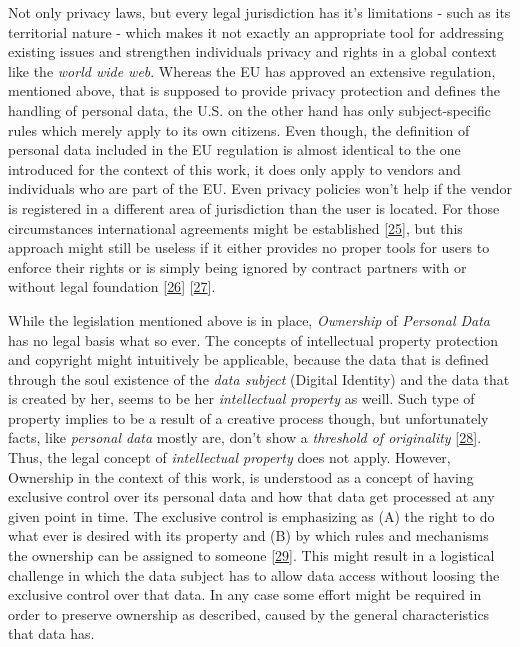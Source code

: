 \documentclass[12pt,english,a4paper,titlepage,cleardoublepage=empty,dottedtoc]{report}
\begin{document}
Not only privacy laws, but every legal jurisdiction has it's limitations
- such as its territorial nature - which makes it not exactly an
appropriate tool for addressing existing issues and strengthen
individuals privacy and rights in a global context like the \emph{world
wide web}. Whereas the EU has approved an extensive regulation,
mentioned above, that is supposed to provide privacy protection and
defines the handling of personal data, the U.S. on the other hand has
only subject-specific rules which merely apply to its own citizens. Even
though, the definition of personal data included in the EU regulation is
almost identical to the one introduced for the context of this work, it
does only apply to vendors and individuals who are part of the EU. Even
privacy policies won't help if the vendor is registered in a different
area of jurisdiction than the user is located. For those circumstances
international agreements might be established
{[}\protect\hyperlink{ref-web_2016_international-privacy-standards}{25}{]},
but this approach might still be useless if it either provides no proper
tools for users to enforce their rights or is simply being ignored by
contract partners with or without legal foundation
{[}\protect\hyperlink{ref-web_2017_privacy-shield_faq}{26}{]}
{[}\protect\hyperlink{ref-web_2017_privacy-shield_kritik}{27}{]}.

While the legislation mentioned above is in place,
\emph{\protect\hypertarget{def--ownership}{}{Ownership}} of
\emph{Personal Data} has no legal basis what so ever. The concepts of
intellectual property protection and copyright might intuitively be
applicable, because the data that is defined through the soul existence
of the \emph{data subject} (Digital Identity) and the data that is
created by her, seems to be her \emph{intellectual property} as weill.
Such type of property implies to be a result of a creative process
though, but unfortunately facts, like \emph{personal data} mostly are,
don't show a \emph{threshold of originality}
{[}\protect\hyperlink{ref-paper_2014_who-owns-yours-data}{28}{]}. Thus,
the legal concept of \emph{intellectual property} does not apply.
However, \protect\hypertarget{def--ownership}{}{Ownership} in the
context of this work, is understood as a concept of having exclusive
control over its personal data and how that data get processed at any
given point in time. The exclusive control is emphasizing as (A) the
right to do what ever is desired with its property and (B) by which
rules and mechanisms the ownership can be assigned to someone
{[}\protect\hyperlink{ref-book_1987_private-ownership_definition}{29}{]}.
This might result in a logistical challenge in which the data subject
has to allow data access without loosing the exclusive control over that
data. In any case some effort might be required in order to preserve
ownership as described, caused by the general characteristics that data
has.
\end{document}
